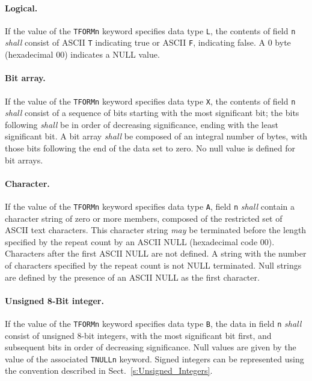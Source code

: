 \documentclass[onecolumn]{aa}
\begin{document}
  
   \paragraph{Logical.} 
    If the value of 
    the {\tt TFORMn} keyword specifies data type {\tt L}, the contents
    of field {\tt n} {\em shall} consist of ASCII {\tt T} indicating true or  
    ASCII {\tt F}, indicating false.   A 0 byte (hexadecimal 00) indicates 
    a NULL value.        

   \paragraph{Bit array.} 
    If the value of 
    the {\tt TFORMn} keyword specifies data type {\tt X}, the 
    contents of field {\tt n} {\em shall} consist of a sequence of bits
    starting with the most significant bit; the bits following {\em shall} be
    in order of decreasing significance, ending with the least 
    significant bit. A bit array {\em shall} be composed of
    an integral number of bytes, with those bits following the end of the 
    data set to zero.  No null value is defined for bit arrays.

    \paragraph{Character.}
    If the value of the {\tt TFORMn} keyword specifies 
    data type {\tt A}, field {\tt n} 
    {\em shall} contain a character string of 
    zero or more members, 
    composed of the restricted set of ASCII text characters.
    This character string {\em may}
    be terminated before the length specified by   
    the repeat count by 
    an ASCII NULL (hexadecimal code 00).  
    Characters after the first ASCII NULL are not defined.
    A string with the number of characters 
    specified by the repeat count is not 
    NULL terminated. 
    Null strings are defined by the presence of
    an ASCII NULL as the first character. 

    \paragraph{Unsigned 8-Bit integer.} 
    If the value of 
    the {\tt TFORMn} keyword specifies data type {\tt B}, the 
    data in field {\tt n} {\em shall} consist of unsigned 8-bit integers, 
    with the most significant bit first, and 
    subsequent bits in order of decreasing significance. 
    Null values are given by the value of the 
    associated {\tt TNULLn} keyword.
    Signed integers can be represented using the convention described 
    in Sect.\ \ref{s:Unsigned_Integers}.
\end{document}
